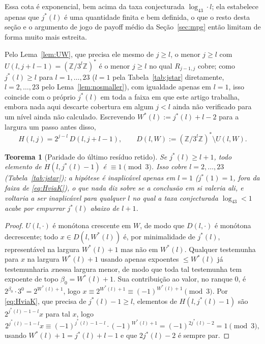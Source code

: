 \documentclass[11pt]{amsart}
\theoremstyle{plain}
\newtheorem{theorem}{Teorema}
\theoremstyle{definition}
\theoremstyle{remark}
\newcommand{\Z}{\mathbb{Z}}
\begin{document}
Essa cota é exponencial, bem acima da taxa conjecturada $\log_43\cdot l$; ela estabelece apenas que
$j^*(l)$ é uma quantidade finita e bem definida, o que o resto desta seção e o argumento de jogo de
payoff médio da Seção~\ref{sec:mpg} então limitam de forma muito mais estreita.

Pelo Lema~\ref{lem:UW}, que precisa ele mesmo de $j\ge l$, o menor $j\ge l$ com
$U(l,j+l-1)=(\Z/3^l\Z)^*$ é o menor $j\ge l$ no qual $R_{j-1,j}$ cobre; como $j^*(l)\ge l$ para
$l=1,\dots,23$ ($l=1$ pela Tabela~\ref{tab:jstar} diretamente, $l=2,\dots,23$ pelo
Lema~\ref{lem:nosmaller}), com igualdade apenas em $l=1$, isso coincide com o próprio $j^*(l)$ em
toda a faixa em que este artigo trabalha, embora nada aqui descarte cobertura em algum $j<l$ ainda
não verificado para um nível ainda não calculado. Escrevendo $W^*(l):=j^*(l)+l-2$ para a largura
um passo antes disso,
\begin{equation}
\label{eq:HviaK}
H(l,j) = 2^{j-l}\,D(l,j+l-1), \qquad D(l,W) := (\Z/3^l\Z)^* \setminus U(l,W).
\end{equation}

\begin{theorem}[Paridade do último resíduo retido]
\label{thm:parity}
Se $j^*(l)\ge l+1$, todo elemento de $H(l,j^*(l)-1)$ é $\equiv1\pmod3$. Isso cobre $l=2,\dots,23$
(Tabela~\ref{tab:jstar}); a hipótese é inaplicável apenas em $l=1$ ($j^*(1)=1$, fora da faixa de
\eqref{eq:HviaK}), o que nada diz sobre se a conclusão em si valeria ali, e voltaria a ser
inaplicável para qualquer $l$ no qual a taxa conjecturada $\log_43<1$ acabe por empurrar $j^*(l)$
abaixo de $l+1$.
\end{theorem}

\begin{proof}
$U(l,\cdot)$ é monótona crescente em $W$, de modo que $D(l,\cdot)$ é monótona decrescente; todo
$x\in D(l,W^*(l))$ é, por minimalidade de $j^*(l)$, representável na largura $W^*(l)+1$ mas não em
$W^*(l)$. Qualquer testemunha para $x$ na largura $W^*(l)+1$ usando apenas expoentes $\le W^*(l)$
já testemunharia $x$nessa largura menor, de modo que toda tal testemunha tem expoente de topo
$\beta_0 = W^*(l)+1$. Sua contribuição ao valor, no ranque $0$, é $2^{\beta_0}\cdot3^0 =
2^{W^*(l)+1}$, logo $x \equiv 2^{W^*(l)+1} \equiv (-1)^{W^*(l)+1} \pmod3$. Por \eqref{eq:HviaK}, que
precisa de $j^*(l)-1\ge l$, elementos de $H(l,j^*(l)-1)$ são $2^{j^*(l)-1-l}x$ para tal $x$, logo
\[
2^{j^*(l)-1-l}x \equiv (-1)^{j^*(l)-1-l}\cdot(-1)^{W^*(l)+1} = (-1)^{2j^*(l)-2} = 1 \pmod3,
\]
usando $W^*(l)+1 = j^*(l)+l-1$ e que $2j^*(l)-2$ é sempre par.
\end{proof}
\end{document}
